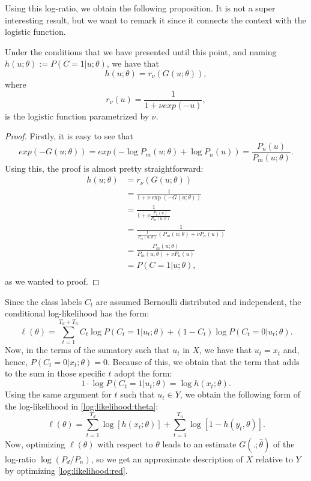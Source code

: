 Using this log-ratio, we obtain the following proposition. It is not a super interesting result, but we want to remark it since it connects the context with the logistic function.
\begin{nprop}
Under the conditions that we have presented until this point, and naming $h(u;\theta) := P(C = 1|u ; \theta)$, we have that
\[
h(u;\theta) = r_\nu(G(u;\theta)),
\]
where
\begin{equation}\label{log:func:nu}
r_\nu(u) = \frac{1}{1 + \nu exp(-u)},
\end{equation}
is the logistic function parametrized by $\nu$.
\end{nprop}
\begin{proof}
Firstly, it is easy to see that
\[
exp(-G(u;\theta)) = exp(- \log P_m(u;\theta) + \log P_n(u)) = \frac{P_n(u)}{P_m(u;\theta)}.    
\]
Using this, the proof is almost pretty straightforward:
\begin{align*}
h(u;\theta) & = r_\nu(G(u;\theta)) \\
& = \frac{1}{1 + \nu \exp(- G(u;\theta))} \\
& = \frac{1}{1 + \nu \frac{P_n(u)}{P_m(u;\theta)}}\\
& = \frac{1}{\frac{1}{P_m(u;\theta)} \left( P_m(u;\theta) + \nu P_n(u)\right)} \\
& = \frac{P_m(u;\theta)}{P_m(u;\theta) + \nu P_n(u)}\\
& = P(C = 1|u; \theta),\\
\end{align*}
as we wanted to proof.
\end{proof}
Since the class labels $C_t$ are assumed Bernoulli distributed and independent, the conditional log-likelihood has the form:
\begin{equation}\label{log:likelihood:theta}
\ell(\theta)  = \sum_{t = 1}^{T_d + T_n} C_t \log P(C_t = 1|u_t; \theta) + (1-C_t) \log P(C_t = 0|u_t;\theta).
\end{equation}
Now, in the terms of the sumatory such that $u_t$ in $X$, we have that  $u_t = x_t$ and, hence,  $P(C_t = 0|x_t;\theta) = 0$. Because of this, we obtain that the term that adds to the sum in those specific $t$ adopt the form:
\[
1\cdot \log P(C_t = 1|u_t;\theta) = \log h(x_t;\theta).
\]
Using the same argument for $t$ such that $u_t \in Y$, we obtain the following form of the log-likelihood in \eqref{log:likelihood:theta}:
\begin{equation}\label{log:likelihood:red}
\ell(\theta) = \sum_{t = 1}^{T_d} \log [h(x_t;\theta)] + \sum_{t = 1}^{T_n} \log[1- h(y_t,\theta)].
\end{equation}
Now, optimizing $\ell(\theta)$ with respect to $\theta$ leads to an estimate $G(.;\hat{\theta})$ of the log-ratio $\log (P_d/P_n)$, so we get an approximate description of $X$ relative to $Y$ by optimizing \eqref{log:likelihood:red}.

